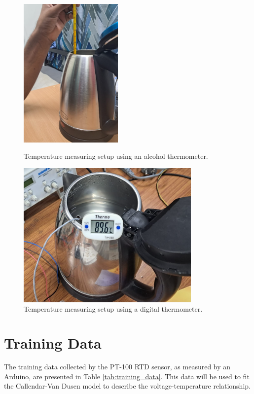 \documentclass[journal,onecolumn]{IEEEtran}
\begin{document}
		\begin{figure}[h]
		\centering
		\begin{minipage}[b]{0.45\textwidth}
			\centering
			\includegraphics[width=0.45\textwidth]{figs/alcohol.png}
			\caption{Temperature measuring setup using an alcohol thermometer.}
			\label{fig:alcohol_temperature}
		\end{minipage}
		\hspace{0.05\textwidth}
		\begin{minipage}[b]{0.45\textwidth}
				\centering
				\includegraphics[width=0.8\textwidth]{figs/digital.png}
				\caption{Temperature measuring setup using a digital thermometer.}
				\label{fig:digital_temperature}
		\end{minipage}
	\end{figure}
	\section{Training Data}
	The training data collected by the PT-100 RTD sensor, as measured by an Arduino, are presented in Table \ref{tab:training_data}. This data will be used to fit the Callendar-Van Dusen model to describe the voltage-temperature relationship.
	
\end{document}
